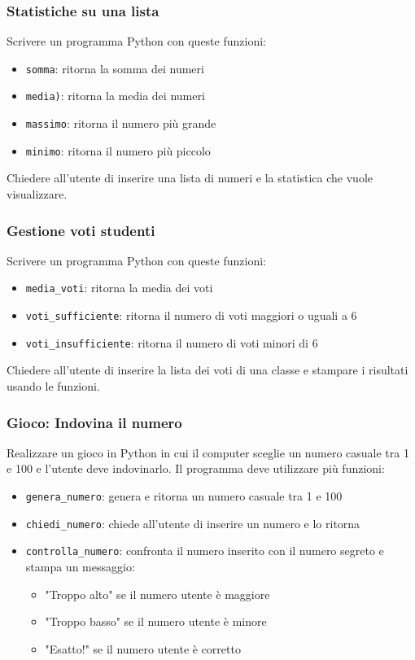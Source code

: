 \documentclass[a4paper,12pt]{article}
\begin{document}
	\subsubsection{Statistiche su una lista}
	Scrivere un programma Python con queste funzioni:
	\begin{itemize}
		\item \texttt{somma}: ritorna la somma dei numeri
		\item \texttt{media)}: ritorna la media dei numeri
		\item \texttt{massimo}: ritorna il numero più grande
		\item \texttt{minimo}: ritorna il numero più piccolo
	\end{itemize}
	Chiedere all'utente di inserire una lista di numeri e la statistica che vuole visualizzare.
	
	\subsubsection{Gestione voti studenti}
	Scrivere un programma Python con queste funzioni:
	\begin{itemize}
		\item \texttt{media\_voti}: ritorna la media dei voti
		\item \texttt{voti\_sufficiente}: ritorna il numero di voti maggiori o uguali a 6
		\item \texttt{voti\_insufficiente}: ritorna il numero di voti minori di 6
	\end{itemize}
	Chiedere all'utente di inserire la lista dei voti di una classe e stampare i risultati usando le funzioni.
	
	\subsubsection{Gioco: Indovina il numero}
	Realizzare un gioco in Python in cui il computer sceglie un numero casuale tra 1 e 100 e l'utente deve indovinarlo.  
	Il programma deve utilizzare più funzioni:
	
	\begin{itemize}
		\item \texttt{genera\_numero}: genera e ritorna un numero casuale tra 1 e 100
		\item \texttt{chiedi\_numero}: chiede all'utente di inserire un numero e lo ritorna
		\item \texttt{controlla\_numero}: confronta il numero inserito con il numero segreto e stampa un messaggio:
		\begin{itemize}
			\item "Troppo alto" se il numero utente è maggiore
			\item "Troppo basso" se il numero utente è minore
			\item "Esatto!" se il numero utente è corretto
		\end{itemize}
	\end{itemize}
	
\end{document}
